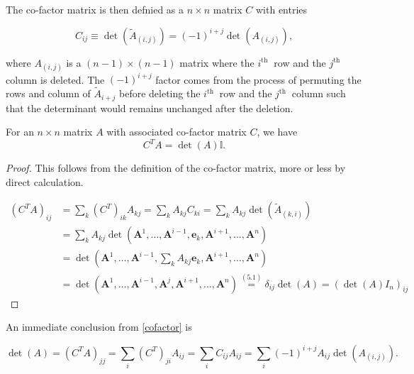 \documentclass[a4paper,12pt]{report}
\begin{document}
The co-factor matrix is then defnied as a \(n\times n\) matrix \(C\) with entries 

\begin{equation}
    C_{ij} \equiv \det (\tilde{A}_{(i,j)}  ) = (-1)^{i+j} \det (A_{(i,j)} ) ,
\end{equation}

where \(A_{(i,j)} \) is a \((n-1)\times (n-1)\) matrix where the \(i^{\text{th }} \) row and the \(j^{\text{th }} \) column is deleted. The \((-1)^{i+j} \) factor comes from the process of permuting the rows and column of \(\tilde{A}_{i+j}  \) before deleting the \(i^{\text{th }} \) row and the \(j^{\text{th }} \) column such that the determinant would remains unchanged after the deletion.

\begin{lemma} \label{cofactor} 
For an \(n \times  n\) matrix \(A\) with associated co-factor matrix \(C\), we have 
\begin{equation}
    C^{T} A = \det (A) \mathbb{I}. 
\end{equation}
 
\end{lemma}

\begin{proof}
    This follows from the definition of the co-factor matrix, more or less by direct calculation.

    \begin{equation}
    \begin{aligned}
    (C^T A)_{ij} &= \sum_k (C^T)_{ik} A_{kj} = \sum_k A_{kj} C_{ki} = \sum_k A_{kj} \det(\tilde{A}_{(k,i)}) \\
    &= \sum_k A_{kj} \det(\mathbf{A}^1, \ldots, \mathbf{A}^{i-1}, \mathbf{e}_k, \mathbf{A}^{i+1}, \ldots, \mathbf{A}^n) \\
    &= \det\left(\mathbf{A}^1, \ldots, \mathbf{A}^{i-1}, \sum_k A_{kj} \mathbf{e}_k, \mathbf{A}^{i+1}, \ldots, \mathbf{A}^n\right) \\
    &= \det(\mathbf{A}^1, \ldots, \mathbf{A}^{i-1}, \mathbf{A}^j, \mathbf{A}^{i+1}, \ldots, \mathbf{A}^n) \overset{(5.1)}{=} \delta_{ij} \det(A) = (\det(A) I_n)_{ij}
    \end{aligned}
    \end{equation}
    

\end{proof}

An immediate conclusion from \cref{cofactor}  is

\begin{equation}
\det(A) = (C^T A)_{jj} = \sum_i (C^T)_{ji} A_{ij} = \sum_i C_{ij} A_{ij} = \sum_i (-1)^{i+j} A_{ij} \det(A_{(i,j)}).
\end{equation}
\end{document}
